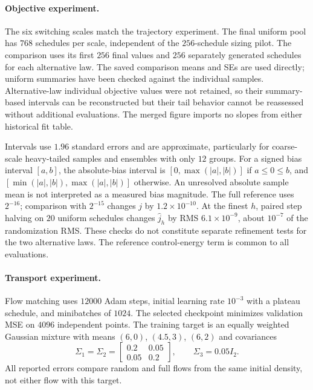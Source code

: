 \paragraph{Objective experiment.}
The six switching scales match the trajectory experiment. The final uniform pool has $768$ schedules per scale, independent of the $256$-schedule sizing pilot. The comparison uses its first $256$ final values and $256$ separately generated schedules for each alternative law. The saved comparison means and SEs are used directly; uniform summaries have been checked against the individual samples. Alternative-law individual objective values were not retained, so their summary-based intervals can be reconstructed but their tail behavior cannot be reassessed without additional evaluations. The merged figure imports no slopes from either historical fit table.

Intervals use $1.96$ standard errors and are approximate, particularly for coarse-scale heavy-tailed samples and ensembles with only $12$ groups. For a signed bias interval $[a,b]$, the absolute-bias interval is $[0,\max(|a|,|b|)]$ if $a\le0\le b$, and $[\min(|a|,|b|),\max(|a|,|b|)]$ otherwise. An unresolved absolute sample mean is not interpreted as a measured bias magnitude. The full reference uses $2^{-16}$; comparison with $2^{-15}$ changes $j$ by $1.2\times10^{-10}$. At the finest $h$, paired step halving on $20$ uniform schedules changes $\hat j_h$ by RMS $6.1\times10^{-9}$, about $10^{-7}$ of the randomization RMS. These checks do not constitute separate refinement tests for the two alternative laws. The reference control-energy term is common to all evaluations.

\paragraph{Transport experiment.}
Flow matching uses $12000$ Adam steps, initial learning rate $10^{-3}$ with a plateau schedule, and minibatches of $1024$. The selected checkpoint minimizes validation MSE on $4096$ independent points. The training target is an equally weighted Gaussian mixture with means $(6,0)$, $(4.5,3)$, $(6,2)$ and covariances
\[
\Sigma_1=\Sigma_2=\begin{bmatrix}0.2&0.05\\0.05&0.2\end{bmatrix},
\qquad\Sigma_3=0.05I_2.
\]
All reported errors compare random and full flows from the same initial density, not either flow with this target.

